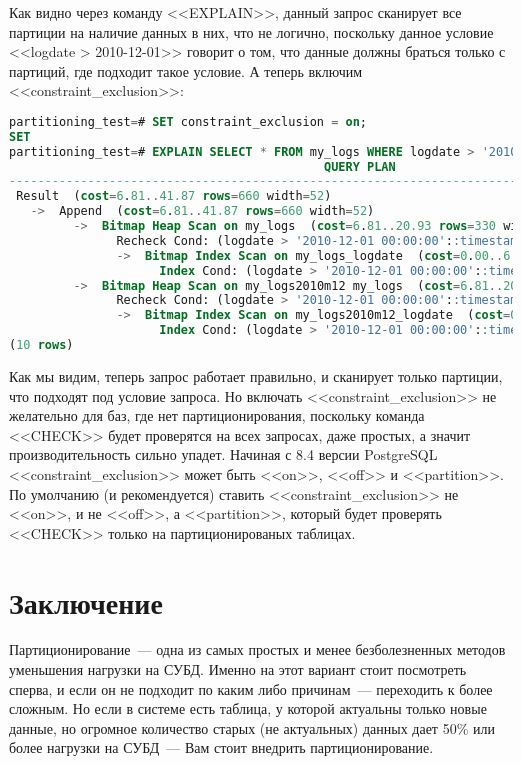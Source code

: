 Как видно через команду <<EXPLAIN>>, данный запрос сканирует все партиции на наличие данных в них, что не логично,
поскольку данное условие <<logdate > 2010-12-01>> говорит о том, что данные должны браться только с партиций,
где подходит такое условие. А теперь включим <<constraint\_exclusion>>:
\begin{lstlisting}[language=SQL,label=lst:partitioning15,caption=<<constraint\_exclusion>> ON]
partitioning_test=# SET constraint_exclusion = on;
SET
partitioning_test=# EXPLAIN SELECT * FROM my_logs WHERE logdate > '2010-12-01';
                                            QUERY PLAN
---------------------------------------------------------------------------------------------------
 Result  (cost=6.81..41.87 rows=660 width=52)
   ->  Append  (cost=6.81..41.87 rows=660 width=52)
         ->  Bitmap Heap Scan on my_logs  (cost=6.81..20.93 rows=330 width=52)
               Recheck Cond: (logdate > '2010-12-01 00:00:00'::timestamp without time zone)
               ->  Bitmap Index Scan on my_logs_logdate  (cost=0.00..6.73 rows=330 width=0)
                     Index Cond: (logdate > '2010-12-01 00:00:00'::timestamp without time zone)
         ->  Bitmap Heap Scan on my_logs2010m12 my_logs  (cost=6.81..20.93 rows=330 width=52)
               Recheck Cond: (logdate > '2010-12-01 00:00:00'::timestamp without time zone)
               ->  Bitmap Index Scan on my_logs2010m12_logdate  (cost=0.00..6.73 rows=330 width=0)
                     Index Cond: (logdate > '2010-12-01 00:00:00'::timestamp without time zone)
(10 rows)
\end{lstlisting}

Как мы видим, теперь запрос работает правильно, и сканирует только партиции, что подходят под условие запроса.
Но включать <<constraint\_exclusion>> не желательно для баз, где нет партиционирования,
поскольку команда <<CHECK>> будет проверятся на всех запросах, даже простых, а значит производительность сильно упадет.
Начиная с 8.4 версии PostgreSQL <<constraint\_exclusion>> может быть <<on>>, <<off>> и <<partition>>. По умолчанию
(и рекомендуется) ставить
<<constraint\_exclusion>> не <<on>>, и не <<off>>, а <<partition>>, который будет проверять <<CHECK>> только на
партиционированых таблицах.

\section{Заключение}
Партиционирование~--- одна из самых простых и менее безболезненных методов уменьшения нагрузки на СУБД.
Именно на этот вариант стоит посмотреть сперва, и если он не подходит по каким либо причинам~--- переходить к более сложным.
Но если в системе есть таблица, у которой актуальны только новые данные, но огромное количество старых (не актуальных)
данных дает 50\% или более нагрузки на СУБД~--- Вам стоит внедрить партиционирование.